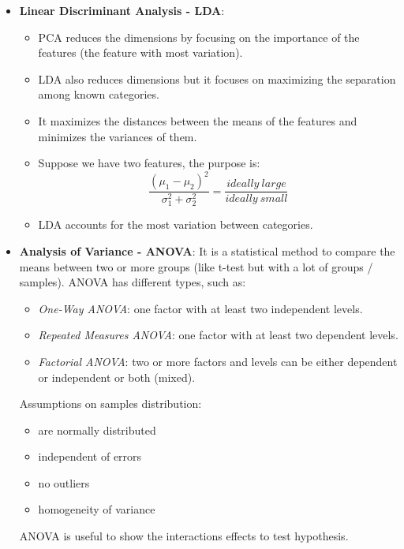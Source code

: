 \documentclass[11pt, twocolumn]{article}
\begin{document}
\begin{itemize}
\item \textbf{Linear Discriminant Analysis - LDA}:
\begin{itemize}
\item PCA reduces the dimensions by focusing on the importance of the features (the feature with {\color{blue}most variation}).
\item LDA also reduces dimensions but it focuses on {\color{blue}maximizing the separation} among known categories.
\item It maximizes the distances between the means of the features and minimizes the variances of them.
\item Suppose we have two features, the purpose is:
$$\frac{(\mu_1 - \mu_2)^2}{\sigma_1^2 + \sigma_2^2} = \frac{ideally ~ large}{ideally ~ small}$$
\item LDA accounts for the most variation {\color{blue}between} categories.
\end{itemize}
\end{itemize}

\begin{itemize}
\item \textbf{Analysis of Variance - ANOVA}:
It is a statistical method to {\color{blue} compare the means} between two or more groups (like t-test but with a lot of groups / samples). ANOVA has different types, such as: 
\begin{itemize}
\item \textit{One-Way ANOVA}: one factor with at least two independent levels.
\item \textit{Repeated Measures ANOVA}: one factor with at least two dependent levels.
\item \textit{Factorial ANOVA}: two or more factors and levels can be either dependent or independent or both (mixed).
\end{itemize}
Assumptions on samples distribution:
\begin{itemize}
\item are normally distributed
\item independent of errors
\item no outliers
\item homogeneity of variance
\end{itemize}
ANOVA is useful to show the {\color{blue}interactions effects to test hypothesis}.
\end{itemize}
\end{document}
